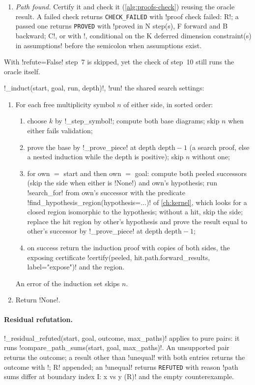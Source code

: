 \begin{algorithm}[Prover]
\begin{enumerate}
\item \emph{Path found.} Certify it and check it (\cref{alg:proofs-check}) reusing the oracle result. A failed check returns \texttt{CHECK\_FAILED} with \code!proof check failed: R!; a passed one returns \texttt{PROVED} with \code!proved in N step(s), F forward and B backward; C!, or with \code!, conditional on the K deferred dimension constraint(s) in assumptions! before the semicolon when assumptions exist.
\end{enumerate}
\end{algorithm}

With \py!refute=False! step~7 is skipped, yet the check of step~10 still runs the oracle itself.

\begin{algorithm}\label{alg:proofs-induct}
\py!_induct(start, goal, run, depth)!, \py!run! the shared search settings:
\begin{enumerate}
\item For each free multiplicity symbol $n$ of either side, in sorted order:
  \begin{enumerate}
  \item choose $k$ by \py!_step_symbol!; compute both base diagrams; skip $n$ when either fails validation;
  \item prove the base by \py!_prove_piece! at depth $\text{depth}-1$ (a search proof, else a nested induction while the depth is positive); skip $n$ without one;
  \item for own $=$ start and then own $=$ goal: compute both peeled successors (skip the side when either is \py!None!) and own's hypothesis; run \py!search_for! from own's successor with the predicate \py!find_hypothesis_region(hypothesis=...)! of \cref{ch:kernel}, which looks for a closed region isomorphic to the hypothesis; without a hit, skip the side; replace the hit region by other's hypothesis and prove the result equal to other's successor by \py!_prove_piece! at depth $\text{depth}-1$;
  \item on success return the induction proof with copies of both sides, the exposing certificate \py!certify(peeled, hit.path.forward_results, label="expose")! and the region.
  \end{enumerate}
  An error of the induction set skips $n$.
\item Return \py!None!.
\end{enumerate}
\end{algorithm}

\paragraph{Residual refutation.} \py!_residual_refuted(start, goal, outcome, max_paths)! applies to pure pairs: it runs \py!compare_path_sums(start, goal, max_paths)!. An unsupported pair returns the outcome; a result other than \code!unequal! with both entries returns the outcome with \code!; R! appended; an \code!unequal! returns \texttt{REFUTED} with reason \code!path sums differ at boundary index I: x vs y (R)! and the empty counterexample.

